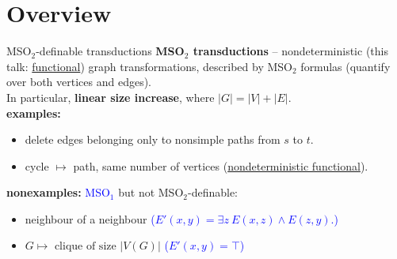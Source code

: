 \section{Overview}
\begin{frame}{MSO$_2$-definable transductions}
\textbf{MSO$_2$ transductions } -- nondeterministic (this talk: \underline{functional}) graph transformations, described by MSO$_2$ formulas (quantify over both vertices and edges).
\\
In particular, \textbf{linear size increase}, where $|G| = |V| + |E|$.
\pause
\\
\textbf{examples:} 
\pause
\begin{itemize}
	\item delete edges belonging only to nonsimple paths from $s$ to $t$.
	\item cycle $\mapsto$ path, same number of vertices (\underline{nondeterministic functional}).
\end{itemize}
\pause
\textbf{nonexamples:} \textcolor{blue}{MSO$_1$} but not MSO$_2$-definable:
\begin{itemize}
	\item neighbour of a neighbour \textcolor{blue}{($E'(x,y) = \exists z\ E(x, z) \wedge E(z, y).$)}
	\item $G \mapsto \text{ clique of size } |V(G)|$ \textcolor{blue}{($E'(x,y) = \top$)}
\end{itemize}
\end{frame}
